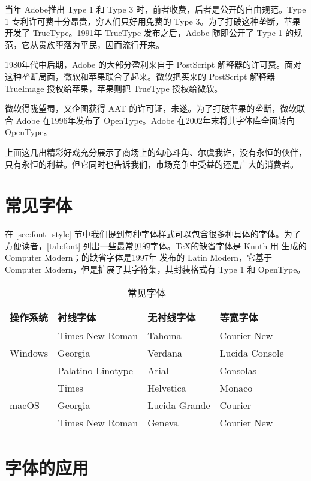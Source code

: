 当年 Adobe\indexAdobe{}推出 Type 1 和 Type 3 时，前者收费，后者是公开的自由规范。Type 1 专利许可费十分昂贵，穷人们只好用免费的 Type 3。为了打破这种垄断，苹果开发了 TrueType。1991年 TrueType 发布之后，Adobe 随即公开了 Type 1 的规范，它从贵族堕落为平民，因而流行开来。

1980年代中后期，Adobe 的大部分盈利来自于 PostScript 解释器的许可费。面对这种垄断局面，微软和苹果联合了起来。微软把买来的 PostScript 解释器 TrueImage 授权给苹果，苹果则把 TrueType 授权给微软。

微软得陇望蜀，又企图获得 AAT 的许可证，未遂。为了打破苹果的垄断，微软联合 Adobe 在1996年发布了 OpenType。Adobe 在2002年末将其字体库全面转向 OpenType。

上面这几出精彩好戏充分展示了商场上的勾心斗角、尔虞我诈，没有永恒的伙伴，只有永恒的利益。但它同时也告诉我们，市场竞争中受益的还是广大的消费者。

\section{常见字体}

在 \ref{sec:font_style} 节中我们提到每种字体样式可以包含很多种具体的字体。为了方便读者，\autoref{tab:font} 列出一些最常见的字体。\TeX 的缺省字体是 Knuth 用 \MF 生成的 Computer Modern；\XeTeX 的缺省字体是1997年 \AmS 发布的 Latin Modern，它基于 Computer Modern，但是扩展了其字符集，其封装格式有 Type 1 和 OpenType。

\begin{table}[htbp]
\caption{常见字体}
\label{tab:font}
\centering
\begin{tabular}{llll}
  \toprule
  操作系统 & 衬线字体        & 无衬线字体 & 等宽字体 \\
  \midrule
  \multirow{3}{*}{Windows}
    & Times New Roman & Tahoma     & Courier New \\
    & Georgia         & Verdana    & Lucida Console \\
    & Palatino Linotype & Arial    & Consolas \\
  \midrule
  \multirow{3}{*}{macOS}
    & Times           & Helvetica  & Monaco \\
    & Georgia         & Lucida Grande & Courier \\
    & Times New Roman & Geneva     & Courier New \\
  \bottomrule
\end{tabular}
\end{table}

\section{字体的应用}

